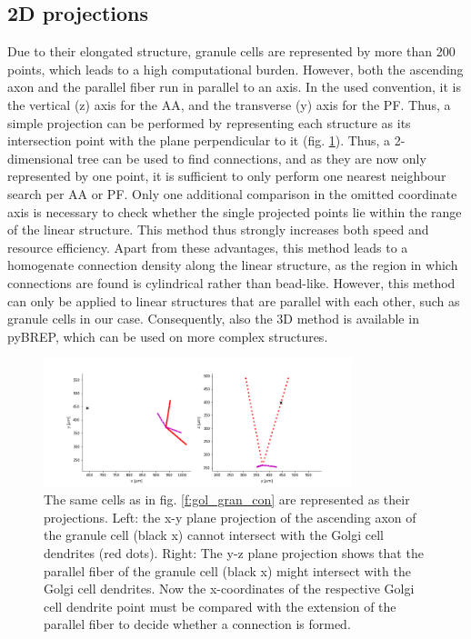 \documentclass[12pt]{report}
\begin{document}
\subsection{2D projections}
Due to their elongated structure, granule cells are represented by more than 200 points, which leads to a high computational burden.
However, both the ascending axon and the parallel fiber run in parallel to an axis. In the used convention, it is the vertical (z) axis for the AA, and the transverse (y) axis for the PF. Thus, a simple projection can be performed by representing each structure as its intersection point with the plane perpendicular to it (fig. \ref{f:proj_2D}). Thus, a 2-dimensional tree can be used to find connections, and as they are now only represented by one point, it is sufficient to only perform one nearest neighbour search per AA or PF. Only one additional comparison in the omitted coordinate axis is necessary to check whether the single projected points lie within the range of the linear structure. This method thus strongly increases both speed and resource efficiency.
Apart from these advantages, this method leads to a homogenate connection density along the linear structure, as the region in which connections are found is cylindrical rather than bead-like.
However, this method can only be applied to linear structures that are parallel with each other, such as granule cells in our case. Consequently, also the 3D method is available in pyBREP, which can be used on more complex structures.

\begin{figure}[H]
	\centering
	\includegraphics[width=0.8\textwidth]{./figures/projected_2D.png}
	\caption{The same cells as in fig. \ref{f:gol_gran_con} are represented as their projections. Left: the x-y plane projection of the ascending axon of the granule cell (black x) cannot intersect with the Golgi cell dendrites (red dots). Right: The y-z plane projection shows that the parallel fiber of the granule cell (black x) might intersect with the Golgi cell dendrites. Now the x-coordinates of the respective Golgi cell dendrite point must be compared with the extension of the parallel fiber to decide whether a connection is formed.}
	\centering
	\label{f:proj_2D}
\end{figure}
 
\end{document}
